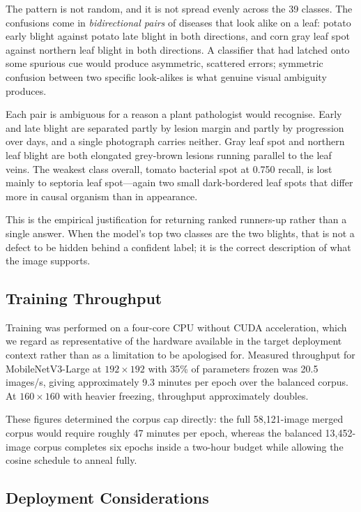 \documentclass[conference]{IEEEtran}
\begin{document}
The pattern is not random, and it is not spread evenly across the 39 classes.
The confusions come in \emph{bidirectional pairs} of diseases that look alike
on a leaf: potato early blight against potato late blight in both directions,
and corn gray leaf spot against northern leaf blight in both directions. A
classifier that had latched onto some spurious cue would produce asymmetric,
scattered errors; symmetric confusion between two specific look-alikes is what
genuine visual ambiguity produces.

Each pair is ambiguous for a reason a plant pathologist would recognise. Early
and late blight are separated partly by lesion margin and partly by
progression over days, and a single photograph carries neither. Gray leaf spot
and northern leaf blight are both elongated grey-brown lesions running
parallel to the leaf veins. The weakest class overall, tomato bacterial spot
at 0.750 recall, is lost mainly to septoria leaf spot---again two small
dark-bordered leaf spots that differ more in causal organism than in
appearance.

This is the empirical justification for returning ranked runners-up rather than
a single answer. When the model's top two classes are the two blights, that is
not a defect to be hidden behind a confident label; it is the correct
description of what the image supports.


\subsection{Training Throughput}

Training was performed on a four-core CPU without CUDA acceleration, which we
regard as representative of the hardware available in the target deployment
context rather than as a limitation to be apologised for. Measured throughput
for MobileNetV3-Large at $192\times192$ with 35\% of parameters frozen was
20.5 images/s, giving approximately 9.3 minutes per epoch over the balanced
corpus. At $160\times160$ with heavier freezing, throughput approximately
doubles.

These figures determined the corpus cap directly: the full 58{,}121-image
merged corpus would require roughly 47 minutes per epoch, whereas the balanced
13{,}452-image corpus completes six epochs inside a two-hour budget while
allowing the cosine schedule to anneal fully.

\subsection{Deployment Considerations}
\end{document}
